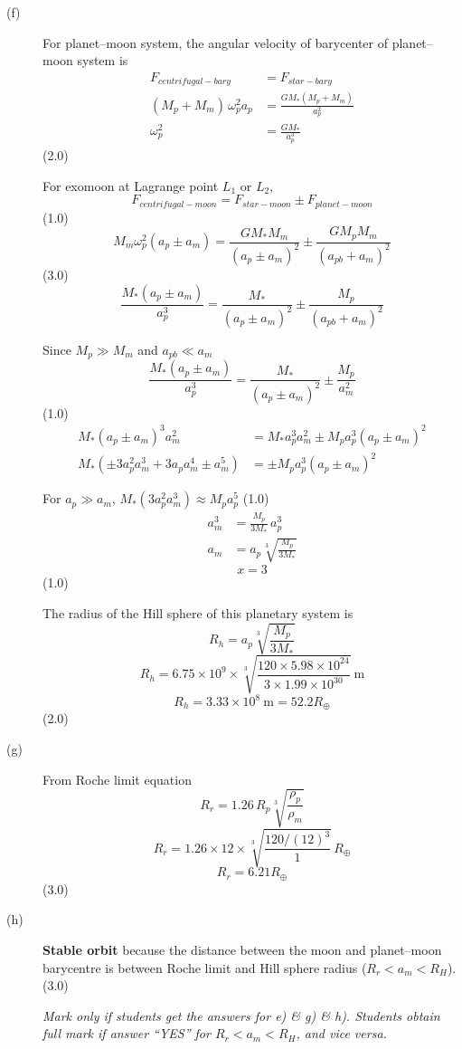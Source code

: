 \begin{description}
\item[(f)] For planet--moon system, the angular velocity of barycenter of
planet--moon system is
\begin{align*}
F_{centrifugal-bary} &= F_{star-bary}\\
(M_p + M_m)\,\omega_p^2 a_p &= \frac{GM_*(M_p + M_m)}{a_p^2}\\
\omega_p^2 &= \frac{GM_*}{a_p^3}
\end{align*}
\hfill(2.0)

For exomoon at Lagrange point $L_1$ or $L_2$,
\[ F_{centrifugal-moon} = F_{star-moon} \pm F_{planet-moon} \]
\hfill(1.0)
\[ M_m\omega_p^2(a_p \pm a_m)
   = \frac{GM_*M_m}{(a_p \pm a_m)^2} \pm \frac{GM_pM_m}{(a_{pb}+a_m)^2} \]
\hfill(3.0)
\[ \frac{M_*(a_p \pm a_m)}{a_p^3}
   = \frac{M_*}{(a_p \pm a_m)^2} \pm \frac{M_p}{(a_{pb}+a_m)^2} \]

Since $M_p \gg M_m$ and $a_{pb} \ll a_m$
\[ \frac{M_*(a_p \pm a_m)}{a_p^3}
   = \frac{M_*}{(a_p \pm a_m)^2} \pm \frac{M_p}{a_m^2} \]
\hfill(1.0)
\begin{align*}
M_*(a_p \pm a_m)^3 a_m^2 &= M_*a_p^3 a_m^2 \pm M_p a_p^3 (a_p \pm a_m)^2\\
M_*(\pm 3a_p^2 a_m^3 + 3a_p a_m^4 \pm a_m^5)
  &= \pm M_p a_p^3 (a_p \pm a_m)^2
\end{align*}

For $a_p \gg a_m$, $M_*(3a_p^2 a_m^3) \approx M_p a_p^5$ \hfill(1.0)
\begin{align*}
a_m^3 &= \frac{M_p}{3M_*}\,a_p^3\\
a_m &= a_p\sqrt[3]{\frac{M_p}{3M_*}}
\end{align*}
\[ x = 3 \]
\hfill(1.0)

The radius of the Hill sphere of this planetary system is
\[ R_h = a_p\sqrt[3]{\frac{M_p}{3M_*}} \]
\[ R_h = 6.75\times10^{9}\times
   \sqrt[3]{\frac{120\times5.98\times10^{24}}{3\times1.99\times10^{30}}}
   \ \mathrm{m} \]
\[ R_h = 3.33\times10^{8}\ \mathrm{m} = 52.2 R_\oplus \]
\hfill(2.0)

\item[(g)] From Roche limit equation
\[ R_r = 1.26\,R_p\sqrt[3]{\frac{\rho_p}{\rho_m}} \]
\[ R_r = 1.26\times12\times\sqrt[3]{\frac{120/(12)^3}{1}}\,R_\oplus \]
\[ R_r = 6.21 R_\oplus \]
\hfill(3.0)

\item[(h)] \textbf{Stable orbit} because the distance between the moon and
planet--moon barycentre is between Roche limit and Hill sphere radius
($R_r < a_m < R_H$). \hfill(3.0)

\textit{Mark only if students get the answers for e) \& g) \& h). Students
obtain full mark if answer ``YES'' for $R_r < a_m < R_H$, and vice versa.}
\end{description}

